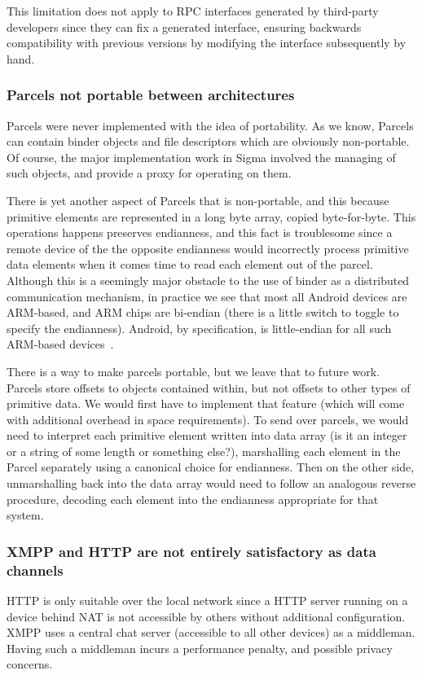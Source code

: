 \documentclass[prodmode]{acmlarge}
\begin{document}
This limitation does not apply to RPC interfaces generated by third-party developers since they can fix a generated interface, ensuring backwards compatibility with previous versions by modifying the interface subsequently by hand.

\subsubsection{Parcels not portable between architectures}
Parcels were never implemented with the idea of portability. As we know, Parcels can contain binder objects and file descriptors which are obviously non-portable. Of course, the major implementation work in Sigma involved the managing of such objects, and provide a proxy for operating on them.

There is yet another aspect of Parcels that is non-portable, and this because primitive elements are represented in a long byte array, copied byte-for-byte. This operations happens preserves endianness, and this fact is troublesome since a remote device of the the opposite endianness would incorrectly process primitive data elements when it comes time to read each element out of the parcel. Although this is a seemingly major obstacle to the use of binder as a distributed communication mechanism, in practice we see that most all Android devices are ARM-based, and ARM chips are bi-endian (there is a little switch to toggle to specify the endianness). Android, by specification, is little-endian for all such ARM-based devices~\cite{ARMLittleEndian}.

There is a way to make parcels portable, but we leave that to future work. Parcels store offsets to objects contained within, but not offsets to other types of primitive data. We would first have to implement that feature (which will come with additional overhead in space requirements). To send over parcels, we would need to interpret each primitive element written into data array (is it an integer or a string of some length or something else?), marshalling each element in the Parcel separately using a canonical choice for endianness. Then on the other side, unmarshalling back into the data array would need to follow an analogous reverse procedure, decoding each element into the endianness appropriate for that system.

\subsubsection{XMPP and HTTP are not entirely satisfactory as data channels}
HTTP is only suitable over the local network since a HTTP server running on a device behind NAT is not accessible by others without additional configuration. XMPP uses a central chat server (accessible to all other devices) as a middleman. Having such a middleman incurs a performance penalty, and possible privacy concerns.
\end{document}
